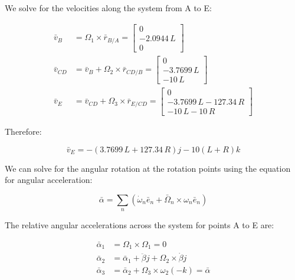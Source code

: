 \documentclass[12pt, letterpaper]{../assignment}
\begin{document}
We solve for the velocities along the system from A to E:

\begin{equation*}
    \begin{aligned}
        \bar{v}_B &= \Omega_1 \times \bar{r}_{B/A} = \left[\begin{array}{c} 0\\ -2.0944\,L\\ 0 \end{array}\right] \\
        \bar{v}_{CD} &= \bar{v}_B + \Omega_2 \times \bar{r}_{CD/B} = \left[\begin{array}{c} 0\\ -3.7699\,L\\ -10\,L \end{array}\right] \\
        \bar{v}_E &= \bar{v}_{CD} + \Omega_3 \times \bar{r}_{E/CD} = \left[\begin{array}{c} 0\\ -3.7699\,L-127.34\,R\\ -10\,L-10\,R \end{array}\right]
    \end{aligned}
\end{equation*}

Therefore:

\begin{answer}
$$ \bar{v}_E =   -\left(3.7699\,L+127.34\,R\right) j - 10\left(L+R \right)k $$
\end{answer}

We can solve for the angular rotation at the rotation points using the equation for angular acceleration:

$$ \bar{\alpha} =
\sum_n \left( \dot{\omega}_n \bar{e}_n + \bar{\Omega}_n \times \omega_n \bar{e}_n \right) $$

The relative angular accelerations across the system for points A to E are:

\begin{equation*}
\begin{aligned}
\bar{\alpha}_1 &= \Omega_1 \times \Omega_1 = 0\\
\bar{\alpha}_2 &= \bar{\alpha}_1 + \ddot{\beta} j + \Omega_2 \times \dot{\beta} j\\
\bar{\alpha}_3 &= \bar{\alpha}_2 + \Omega_3 \times \omega_2(-k) = \bar{\alpha} %
\end{aligned}
\end{equation*}
\end{document}
